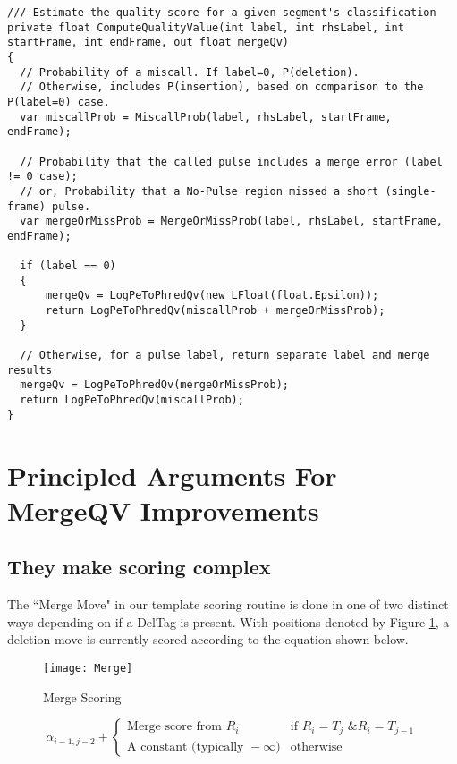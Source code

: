 \documentclass[fleqn,10pt]{SelfArx} %
\begin{document}
\lstset{style=sharpc}
\begin{lstlisting}[frame=single, float=*]
/// Estimate the quality score for a given segment's classification
private float ComputeQualityValue(int label, int rhsLabel, int startFrame, int endFrame, out float mergeQv)
{
  // Probability of a miscall. If label=0, P(deletion).  
  // Otherwise, includes P(insertion), based on comparison to the P(label=0) case.
  var miscallProb = MiscallProb(label, rhsLabel, startFrame, endFrame);  

  // Probability that the called pulse includes a merge error (label != 0 case);
  // or, Probability that a No-Pulse region missed a short (single-frame) pulse.
  var mergeOrMissProb = MergeOrMissProb(label, rhsLabel, startFrame, endFrame);  

  if (label == 0)
  {
      mergeQv = LogPeToPhredQv(new LFloat(float.Epsilon)); 
      return LogPeToPhredQv(miscallProb + mergeOrMissProb);
  }  

  // Otherwise, for a pulse label, return separate label and merge results
  mergeQv = LogPeToPhredQv(mergeOrMissProb);
  return LogPeToPhredQv(miscallProb);
}       
\end{lstlisting}


\section{Principled Arguments For MergeQV Improvements}



\subsection{They make scoring complex}

The ``Merge Move" in our template scoring routine is done in one of two distinct ways depending on if a DelTag is present.  With positions denoted by Figure \ref{fig:del}, a deletion move is currently scored according to the equation shown below.  

\begin{figure}[ht]\centering %
\texttt{[image: Merge]}
\caption{Merge Scoring}
\label{fig:del}
\end{figure}

\[
 \alpha_{i-1,j-2}  +  \begin{cases}
			\text{Merge score from } R_{i}  & \text{if }  R_{i} = T_{j} \text{ \& } R_{i} = T_{j-1} \\
			\text{A constant (typically }-\infty\text{)} & \text{otherwise}
			\end{cases}
\]
\end{document}
